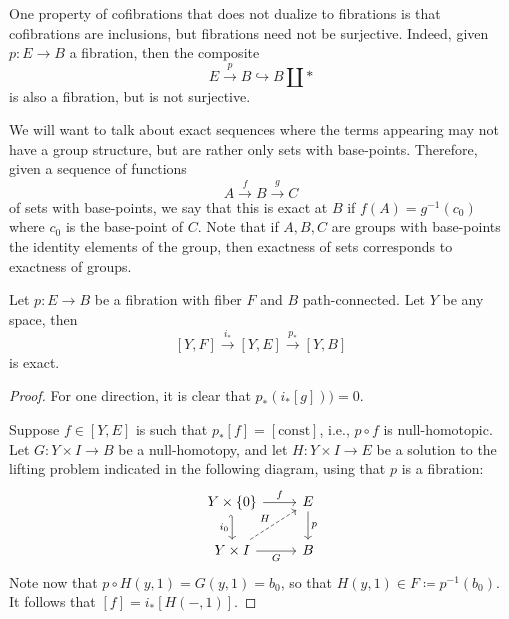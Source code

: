 \documentclass[ma3408.tex]{subfiles}
\begin{document}
\begin{Rem}
One property of cofibrations that does not dualize to fibrations is that cofibrations are inclusions, but fibrations need not be surjective. Indeed, given $p \colon E \to B$ a fibration, then the composite
\[
E \xrightarrow{p} B \hookrightarrow B \coprod \ast
\]
is also a fibration, but is not surjective. 
\end{Rem}
\begin{Rem}
	We will want to talk about exact sequences where the terms appearing may not have a group structure, but are rather only sets with base-points. Therefore, given a sequence of functions
	\[
A \xrightarrow{f} B \xrightarrow{g} C
	\]
	of sets with base-points, we say that this is exact at $B$ if $f(A) = g^{-1}(c_0)$ where $c_0$ is the base-point of $C$. Note that if $A,B,C$ are groups with base-points the identity elements of the group, then exactness of sets corresponds to exactness of groups. 
\end{Rem}
\begin{Thm}\label{thm:fibration_ses}
	Let $p \colon E \to B$ be a fibration with fiber $F$ and $B$ path-connected. Let $Y$ be any space, then
	\[
[Y,F] \xrightarrow{i_*} [Y,E] \xrightarrow{p_*} [Y,B]
	\]
	is exact. 
\end{Thm}
\begin{proof}
	For one direction, it is clear that $p_*(i_*[g])) = 0$.

	 Suppose $f \in [Y,E]$ is such that $p_*[f] = [\text{const}]$, i.e., $p \circ f$ is null-homotopic. Let $G \colon Y \times I \to B$ be a null-homotopy, and let $H \colon Y \times I \to E$ be a solution to the lifting problem indicated in the following diagram, using that $p$ is a fibration:
\[\begin{tikzcd}
	{Y \times \{0\}} & E \\
	{Y \times I} & B
	\arrow["G"', from=2-1, to=2-2]
	\arrow["p", from=1-2, to=2-2]
	\arrow["{i_0}"', hook', from=1-1, to=2-1]
	\arrow["f",from=1-1, to=1-2]
	\arrow["H", dashed, from=2-1, to=1-2]
\end{tikzcd}\]
Note now that $p \circ H(y,1) = G(y,1) = b_0$, so that $H(y,1) \in F \coloneqq p^{-1}(b_0)$. It follows that $[f] = i_*[H(-,1)]$. 
\end{proof}
\end{document}
